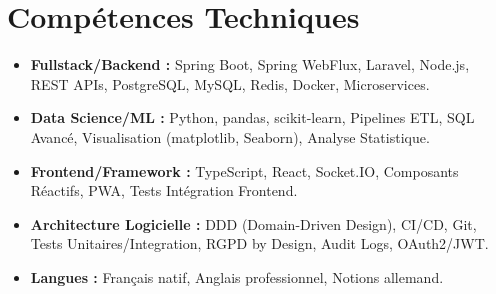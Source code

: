\documentclass[a4paper,11pt]{article}
\begin{document}
\section{Comp\'etences Techniques}
\begin{itemize}[leftmargin=*, nosep]
    \item \small{\textbf{Fullstack/Backend :} Spring Boot, Spring WebFlux, Laravel, Node.js, REST APIs, PostgreSQL, MySQL, Redis, Docker, Microservices.}
    \item \small{\textbf{Data Science/ML :} Python, pandas, scikit-learn, Pipelines ETL, SQL Avanc\'e, Visualisation (matplotlib, Seaborn), Analyse Statistique.}
    \item \small{\textbf{Frontend/Framework :} TypeScript, React, Socket.IO, Composants R\'eactifs, PWA, Tests Int\'egration Frontend.}
    \item \small{\textbf{Architecture Logicielle :} DDD (Domain-Driven Design), CI/CD, Git, Tests Unitaires/Integration, RGPD by Design, Audit Logs, OAuth2/JWT.}
    \item \small{\textbf{Langues :} Fran\c{c}ais natif, Anglais professionnel, Notions allemand.}
\end{itemize}
\end{document}
